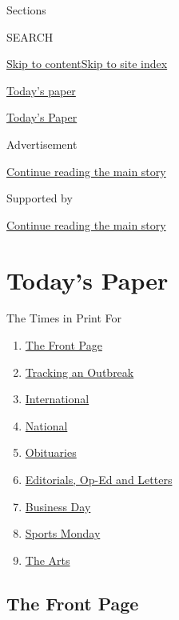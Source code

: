 Sections

SEARCH

\protect\hyperlink{site-content}{Skip to
content}\protect\hyperlink{site-index}{Skip to site index}

\href{https://www.nytimes3xbfgragh.onion/section/todayspaper}{Today's
paper}

\href{https://myaccount.nytimes3xbfgragh.onion/auth/login?response_type=cookie\&client_id=vi}{}

\href{https://www.nytimes3xbfgragh.onion/section/todayspaper}{Today's
Paper}

Advertisement

\protect\hyperlink{after-top}{Continue reading the main story}

Supported by

\protect\hyperlink{after-sponsor}{Continue reading the main story}

\hypertarget{todays-paper}{%
\section{Today's Paper}\label{todays-paper}}

The Times in Print For

\begin{enumerate}
\def\labelenumi{\arabic{enumi}.}
\tightlist
\item
  \protect\hyperlink{thefrontpage}{The Front Page}
\item
  \protect\hyperlink{trackinganoutbreak}{Tracking an Outbreak}
\item
  \protect\hyperlink{international}{International}
\item
  \protect\hyperlink{national}{National}
\item
  \protect\hyperlink{obituaries}{Obituaries}
\item
  \protect\hyperlink{editorialsux2cop-edandletters}{Editorials, Op-Ed
  and Letters}
\item
  \protect\hyperlink{businessday}{Business Day}
\item
  \protect\hyperlink{sportsmonday}{Sports Monday}
\item
  \protect\hyperlink{thearts}{The Arts}
\end{enumerate}

\hypertarget{the-front-page}{%
\subsection{The Front Page}\label{the-front-page}}

